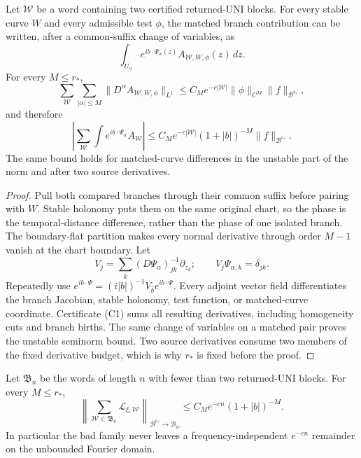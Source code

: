 \begin{lemma}
\label{lem:r27-a2-operator-uni}
Let $\mathcal W$ be a word containing two certified returned-UNI blocks.
For every stable curve $W$ and every admissible test $\phi$, the matched
branch contribution can be written, after a common-suffix change of
variables, as
\[
 \int_{U_\alpha}
 e^{ib\cdot\Psi_\alpha(z)}
 A_{\mathcal W,W,\phi}(z)\,dz.                            \tag{A2.6}
\]
For every $M\le r_*$,
\[
 \sum_{\mathcal W}
 \sum_{|\alpha|\le M}\|D^\alpha A_{\mathcal W,W,\phi}\|_{L^1}
 \le C_Me^{-c|\mathcal W|}\|\phi\|_{C^M}\|f\|_{\mathcal B^{r_*}},        \tag{A2.7}
\]
and therefore
\[
 \left|\sum_{\mathcal W}\int e^{ib\cdot\Psi_\alpha}A_{\mathcal W}\right|
 \le C_Me^{-c|\mathcal W|}(1+|b|)^{-M}\|f\|_{\mathcal B^{r_*}}.          \tag{A2.8}
\]
The same bound holds for matched-curve differences in the unstable part of
the norm and after two source derivatives.
\end{lemma}

\begin{proof}
Pull both compared branches through their common suffix before pairing with
$W$.  Stable holonomy puts them on the same original chart, so the phase is
the temporal-distance difference, rather than the phase of one isolated
branch.  The boundary-flat partition makes every normal derivative through
order $M-1$ vanish at the chart boundary.  Let
\[
 V_j=\sum_k(D\Psi_\alpha)^{-1}_{jk}\partial_{z_k};
 \qquad V_j\Psi_{\alpha,k}=\delta_{jk}.
\]
Repeatedly use
$e^{ib\cdot\Psi}=(i|b|)^{-1}V_{\widehat b}e^{ib\cdot\Psi}$.
Every adjoint vector field differentiates the branch Jacobian, stable
holonomy, test function, or matched-curve coordinate.  Certificate (C1) sums
all resulting derivatives, including homogeneity cuts and branch births.
The same change of variables on a matched pair proves the unstable seminorm
bound.  Two source derivatives consume two members of the fixed derivative
budget, which is why $r_*$ is fixed before the proof.
\end{proof}

\begin{lemma}
\label{lem:r27-a2-bad}
Let $\mathfrak B_n$ be the words of length $n$ with fewer than two returned-UNI
blocks.  For every $M\le r_*$,
\[
 \left\|\sum_{\mathcal W\in\mathfrak B_n}
 \mathcal L_{\xi,\mathcal W}\right\|_{\mathcal B^{r_*}\to\mathcal B_w}
 \le C_Me^{-cn}(1+|b|)^{-M}.                             \tag{A2.9}
\]
In particular the bad family never leaves a frequency-independent
$e^{-cn}$ remainder on the unbounded Fourier domain.
\end{lemma}

